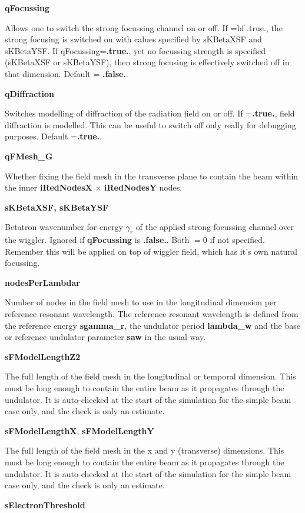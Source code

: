 \documentclass[12pt]{article}%
\begin{document}
{\bf qFocussing}

Allows one to switch the strong focussing channel on or off. If ={bf .true.}, the strong focusing is switched on with calues specified by sKBetaXSF and sKBetaYSF. If qFocussing={\bf .true.}, yet no focussing strength is specified (sKBetaXSF or sKBetaYSF), then strong focusing is effectively switched off in that dimension. Default = {\bf .false.}.

{\bf qDiffraction}

Switches modelling of diffraction of the radiation field on or off. If ={\bf .true.}, field diffraction is modelled. This can be useful to switch off only really for debugging purposes. Default ={\bf .true.}.

{\bf qFMesh\_G}

Whether fixing the field mesh in the transverse plane to contain the beam within the inner {\bf iRedNodesX} $\times$ {\bf iRedNodesY} nodes.


{\bf sKBetaXSF, sKBetaYSF}

Betatron wavenumber for energy $\gamma_r$ of the applied strong focussing channel over the wiggler. Ignored if {\bf qFocussing} is {\bf .false.}. Both $=0$ if not specified. Remember this will be applied on top of wiggler field, which has it's own natural focussing.

{\bf nodesPerLambdar}

Number of nodes in the field mesh to use in the longitudinal dimension per reference resonant wavelength. The reference resonant wavelength is defined from the reference energy {\bf sgamma\_r}, the undulator period {\bf lambda\_w} and the base or reference undulator parameter {\bf saw} in the usual way.

{\bf sFModelLengthZ2}

The full length of the field mesh in the longitudinal or temporal dimension. This must be long enough to contain the entire beam as it propagates through the undulator. It is auto-checked at the start of the simulation for the simple beam case only, and the check is only an estimate.

{\bf sFModelLengthX}, {\bf sFModelLengthY}

The full length of the field mesh in the x and y (transverse) dimensions. This must be long enough to contain the entire beam as it propagates through the undulator. It is auto-checked at the start of the simulation for the simple beam case only, and the check is only an estimate.

{\bf sElectronThreshold}
\end{document}
